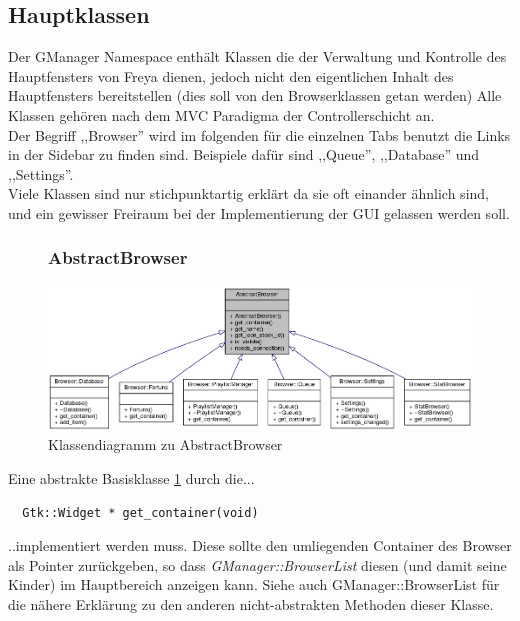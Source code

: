 \subsection{Hauptklassen}
Der GManager Namespace enthält Klassen die der Verwaltung und Kontrolle des Hauptfensters von Freya dienen,
jedoch nicht den eigentlichen Inhalt des Hauptfensters bereitstellen (dies soll von den Browserklassen getan werden)
Alle Klassen gehören nach dem MVC Paradigma der Controllerschicht an.
\\
Der Begriff ,,Browser'' wird im folgenden für die einzelnen Tabs benutzt die Links in der Sidebar zu finden sind. 
Beispiele dafür sind ,,Queue'', ,,Database'' und ,,Settings''.
\\
Viele Klassen sind nur stichpunktartig erklärt da sie oft einander ähnlich sind, und ein gewisser Freiraum bei der Implementierung der
GUI gelassen werden soll.

\newpage
\begin{figure}[htb!]
\subsubsection{AbstractBrowser}
	\centering
        \includegraphics[width=\textwidth]{classAbstractBrowser.png}
	\caption{Klassendiagramm zu AbstractBrowser}
	\label{g_abstract_browser}
\end{figure}


Eine abstrakte Basisklasse \ref{g_abstract_browser} durch die...
\begin{verbatim}
  Gtk::Widget * get_container(void) 
\end{verbatim}
..implementiert werden muss. Diese sollte den umliegenden Container des Browser als Pointer zurückgeben,
so dass \textit{GManager::BrowserList} diesen (und damit seine Kinder) im Hauptbereich anzeigen kann.
Siehe auch GManager::BrowserList für die nähere Erklärung zu den anderen nicht-abstrakten Methoden dieser Klasse.


